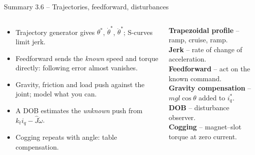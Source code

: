 \documentclass[aspectratio=169,10pt]{beamer}
\begin{document}
\begin{frame}{Summary 3.6 -- Trajectories, feedforward, disturbances}
\begin{columns}[T,onlytextwidth]
\begin{keybox}
\small
\begin{itemize}
\item Trajectory generator gives $\theta^*$, $\dot\theta^*$, $\ddot\theta^*$; S-curves limit jerk.
\item Feedforward sends the \emph{known} speed and torque directly: following error almost vanishes.
\item Gravity, friction and load push against the joint; model what you can.
\item A DOB estimates the \emph{unknown} push from $k_ti_q-\hat J\dot\omega$.
\item Cogging repeats with angle: table compensation.
\end{itemize}
\end{keybox}
\begin{defbox}
\small
\textbf{Trapezoidal profile} -- ramp, cruise, ramp.\\
\textbf{Jerk} -- rate of change of acceleration.\\
\textbf{Feedforward} -- act on the known command.\\
\textbf{Gravity compensation} -- $mgl\cos\theta$ added to $i_q^*$.\\
\textbf{DOB} -- disturbance observer.\\
\textbf{Cogging} -- magnet--slot torque at zero current.
\end{defbox}
\end{columns}
\end{frame}
\end{document}
